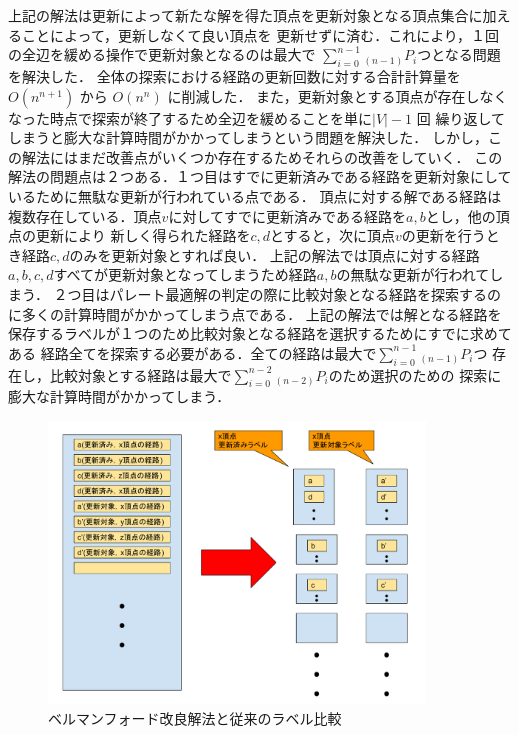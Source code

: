 \documentclass[12pt]{optlab-bachelor}
\begin{document}
上記の解法は更新によって新たな解を得た頂点を更新対象となる頂点集合に加えることによって，更新しなくて良い頂点を
更新せずに済む．これにより，１回の全辺を緩める操作で更新対象となるのは最大で
$\displaystyle \sum_{i=0}^{n-1} {}_{(n-1)}P_i$つとなる問題を解決した．
全体の探索における経路の更新回数に対する合計計算量を $O(n^{n+1})$ から $O(n^n)$ に削減した．
また，更新対象とする頂点が存在しなくなった時点で探索が終了するため全辺を緩めることを単に$|V|-1$ 回
繰り返してしまうと膨大な計算時間がかかってしまうという問題を解決した．
しかし，この解法にはまだ改善点がいくつか存在するためそれらの改善をしていく．
この解法の問題点は２つある．１つ目はすでに更新済みである経路を更新対象にしているために無駄な更新が行われている点である．
頂点に対する解である経路は複数存在している．頂点$v$に対してすでに更新済みである経路を$a,b$とし，他の頂点の更新により
新しく得られた経路を$c,d$とすると，次に頂点$v$の更新を行うとき経路$c,d$のみを更新対象とすれば良い．
上記の解法では頂点に対する経路$a,b,c,d$すべてが更新対象となってしまうため経路$a,b$の無駄な更新が行われてしまう．
２つ目はパレート最適解の判定の際に比較対象となる経路を探索するのに多くの計算時間がかかってしまう点である．
上記の解法では解となる経路を保存するラベルが１つのため比較対象となる経路を選択するためにすでに求めてある
経路全てを探索する必要がある．全ての経路は最大で$\displaystyle \sum_{i=0}^{n-1} {}_{(n-1)}P_i$つ
存在し，比較対象とする経路は最大で$\displaystyle \sum_{i=0}^{n-2} {}_{(n-2)}P_i$のため選択のための
探索に膨大な計算時間がかかってしまう．

\begin{figure}[htbp]
  \centering
  \caption{ベルマンフォード改良解法と従来のラベル比較}
  \includegraphics[width=10.0cm]{fig/fig3.pdf}
\end{figure}
\end{document}
